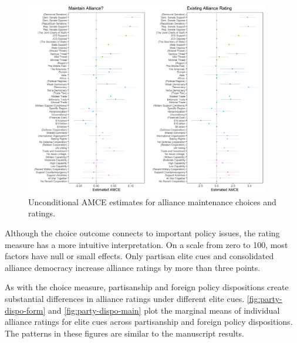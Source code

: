\documentclass[12pt]{article}
\begin{document}
\begin{figure}
	\centering
		\includegraphics[width=0.95\textwidth]{maintenance-plots.png}
	\caption{Unconditional AMCE estimates for alliance maintenance choices and ratings.}
	\label{fig:maintenance-plots}
\end{figure}


Although the choice outcome connects to important policy issues, the rating measure has a more intuitive interpretation. 
On a scale from zero to 100, most factors have null or small effects. 
Only partisan elite cues and consolidated alliance democracy increase alliance ratings by more than three points. 


As with the choice measure, partisanship and foreign policy dispositions create substantial differences in alliance ratings under different elite cues.
\autoref{fig:party-dispo-form} and \autoref{fig:party-dispo-main} plot the marginal means of individual alliance ratings for elite cues across partisanship and foreign policy dispositions. 
The patterns in these figures are similar to the manuscript results.  
\end{document}
